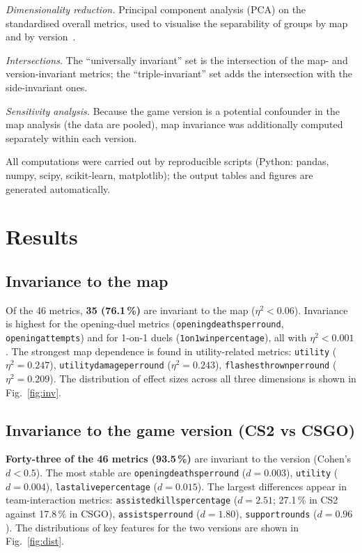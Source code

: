 \textit{Dimensionality reduction.} Principal component analysis (PCA) on the standardised overall
metrics, used to visualise the separability of groups by map and by version~\cite{Jolliffe}.

\textit{Intersections.} The ``universally invariant'' set is the intersection of the map- and
version-invariant metrics; the ``triple-invariant'' set adds the intersection with the
side-invariant ones.

\textit{Sensitivity analysis.} Because the game version is a potential confounder in the map
analysis (the data are pooled), map invariance was additionally computed separately within each
version.

All computations were carried out by reproducible scripts (Python: pandas, numpy, scipy,
scikit-learn, matplotlib); the output tables and figures are generated automatically.

\section{Results}

\subsection{Invariance to the map}

Of the 46 metrics, \textbf{35 (76.1\,\%)} are invariant to the map ($\eta^2 < 0.06$). Invariance
is highest for the opening-duel metrics (\texttt{opening\us{}deaths\us{}per\us{}round},
\texttt{opening\us{}attempts}) and for 1-on-1 duels
(\texttt{1on1\us{}win\us{}percentage}), all with $\eta^2 < 0.001$. The strongest map dependence is
found in utility-related metrics: \texttt{utility} ($\eta^2 = 0.247$),
\texttt{utility\us{}damage\us{}per\us{}round} ($\eta^2 = 0.243$),
\texttt{flashes\us{}thrown\us{}per\us{}round} ($\eta^2 = 0.209$). The distribution of effect sizes
across all three dimensions is shown in Fig.~\ref{fig:inv}.

\subsection{Invariance to the game version (CS2 vs CSGO)}

\textbf{Forty-three of the 46 metrics (93.5\,\%)} are invariant to the version
(Cohen's $d < 0.5$). The most stable are \texttt{opening\us{}deaths\us{}per\us{}round}
($d = 0.003$), \texttt{utility} ($d = 0.004$), \texttt{last\us{}alive\us{}percentage}
($d = 0.015$). The largest differences appear in team-interaction metrics:
\texttt{assisted\us{}kills\us{}percentage} ($d = 2.51$; 27.1\,\% in CS2 against 17.8\,\% in CSGO),
\texttt{assists\us{}per\us{}round} ($d = 1.80$), \texttt{support\us{}rounds} ($d = 0.96$). The
distributions of key features for the two versions are shown in Fig.~\ref{fig:dist}.

